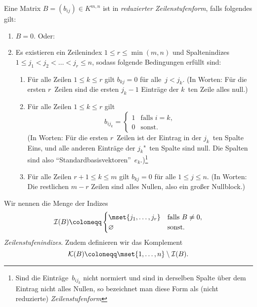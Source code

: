 \documentclass[a4paper]{article}
\begin{document}
\begin{definition}
    Eine Matrix $B = (b_{ij}) \in K^{m,n}$ ist in \emph{reduzierter Zeilenstufenform}, falls folgendes gilt:
    \begin{enumerate}
        \item $B = 0$. Oder:
        \item Es existieren ein Zeilenindex $1 \leq r \leq \min(m,n)$ und Spaltenindizes $1 \leq j_1 < j_2 < \dots < j_r \leq n$, sodass folgende Bedingungen erfüllt sind:
              \begin{enumerate}
                  \item Für alle Zeilen $1 \leq k \leq r$ gilt $b_{kj} = 0$ für alle~$j < j_k$. (In Worten: Für die ersten $r$~Zeilen sind die ersten $j_k-1$ Einträge der $k$~ten Zeile alles null.)
                  \item Für alle Zeilen $1 \leq k \leq r$ gilt
                        \begin{equation*}
                            b_{ij_k} = \begin{cases}
                                1 & \text{falls } i = k, \\
                                0 & \text{sonst}.
                            \end{cases}
                        \end{equation*}
                        (In Worten: Für die ersten $r$~Zeilen ist der Eintrag in der $j_k$~ten Spalte Eins, und alle anderen Einträge der $j_k$"~ten Spalte sind null. Die Spalten sind also "`Standardbasisvektoren"'~$e_k$.)\footnote{Sind die Einträge~$b_{ij_k}$ nicht normiert und sind in derselben Spalte über dem Eintrag nicht alles Nullen, so bezeichnet man diese Form als (nicht reduzierte) \emph{Zeilenstufenform}}
                  \item Für alle Zeilen $r+1 \leq k \leq m$ gilt $b_{kj} = 0$ für alle $1 \leq j \leq n$. (In Worten: Die restlichen $m-r$ Zeilen sind alles Nullen, also ein großer Nullblock.)
              \end{enumerate}
    \end{enumerate}
\end{definition}

\begin{notation}[Zeilenstufenindizes]
    Wir nennen die Menge der Indizes
    \begin{equation*}
        \mathcal{I}(B) \coloneqq \begin{cases}
            \mset{j_1,\dots,j_r} & \text{falls } B \neq 0, \\
            \varnothing          & \text{sonst}.
        \end{cases}
    \end{equation*}
    \emph{Zeilenstufenindizes}. Zudem definieren wir das Komplement
    \begin{equation*}
        \mathcal{K}(B) \coloneqq \mset{1,\dots,n} \setminus \mathcal{I}(B).
    \end{equation*}
\end{notation}
\end{document}
